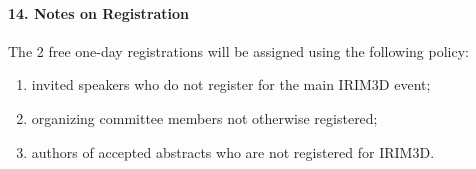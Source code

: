 \documentclass{article}
\begin{document}
\paragraph{14. Notes on Registration}
The 2 free one-day registrations will be assigned using the following policy:
\begin{enumerate}
    \item invited speakers who do not register for the main IRIM3D event;
    \item organizing committee members not otherwise registered; 
    \item authors of accepted abstracts who are not registered for IRIM3D.
\end{enumerate}
\end{document}
